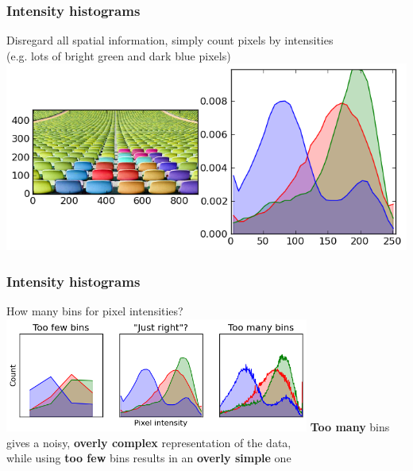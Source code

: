 \begin{frame}
  \frametitle{Intensity histograms}

  \begin{center}
    Disregard all spatial information, simply count pixels by intensities \\
    (e.g. lots of bright green and dark blue pixels)
    \vskip20pt
  \includegraphics[width=\textwidth]{../../code/image_data/chairs_32.png}
  \end{center}

\end{frame}


\begin{frame}
  \frametitle{Intensity histograms}

  \begin{center}
    How many bins for pixel intensities?
    \vskip20pt
    \includegraphics[width=0.75\textwidth]{chairs_hists.png}
    \vskip20pt
    \textbf{Too many} bins gives a noisy, \textbf{overly complex} representation of the data,\\
    while using \textbf{too few} bins results in an \textbf{overly simple} one
  \end{center}

\end{frame}

